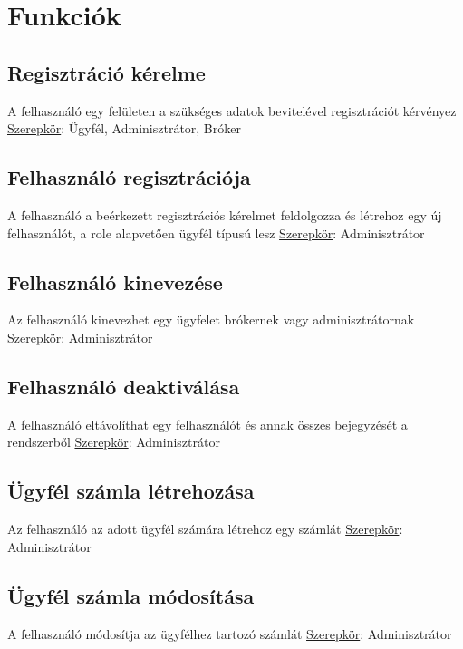 \section{Funkciók}\label{sect:all_use_case}

\subsection{Regisztráció kérelme}
A felhasználó egy felületen a szükséges adatok bevitelével regisztrációt kérvényez
\newline \underline{Szerepkör}: Ügyfél, Adminisztrátor, Bróker

\subsection{Felhasználó regisztrációja}
A felhasználó a beérkezett regisztrációs kérelmet feldolgozza és létrehoz egy új felhasználót, a role alapvetően ügyfél típusú lesz
\newline \underline{Szerepkör}: Adminisztrátor

\subsection{Felhasználó kinevezése}
Az felhasználó kinevezhet egy ügyfelet brókernek vagy adminisztrátornak
\newline \underline{Szerepkör}: Adminisztrátor

\subsection{Felhasználó deaktiválása}
A felhasználó eltávolíthat egy felhasználót és annak összes bejegyzését a rendszerből
\newline \underline{Szerepkör}: Adminisztrátor

\subsection{Ügyfél számla létrehozása}
Az felhasználó az adott ügyfél számára létrehoz egy számlát
\newline \underline{Szerepkör}: Adminisztrátor

\subsection{Ügyfél számla módosítása}
A felhasználó módosítja az ügyfélhez tartozó számlát
\newline \underline{Szerepkör}: Adminisztrátor

